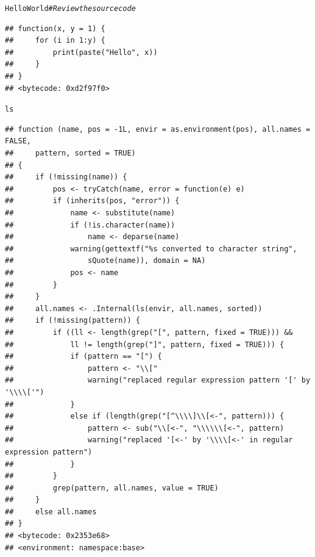 \documentclass{beamer}\usepackage[]{graphicx}\usepackage[]{color}
\makeatletter
\newcommand{\hlcom}[1]{\textcolor[rgb]{0.678,0.584,0.686}{\textit{#1}}}%
\newcommand{\hlstd}[1]{\textcolor[rgb]{0.345,0.345,0.345}{#1}}%
\newenvironment{kframe}{%
 \def\at@end@of@kframe{}%
 \ifinner\ifhmode%
  \def\at@end@of@kframe{\end{minipage}}%
  \begin{minipage}{\columnwidth}%
 \fi\fi%
 \def\FrameCommand##1{\hskip\@totalleftmargin \hskip-\fboxsep
 \colorbox{shadecolor}{##1}\hskip-\fboxsep
     \hskip-\linewidth \hskip-\@totalleftmargin \hskip\columnwidth}%
 \MakeFramed {\advance\hsize-\width
   \@totalleftmargin\z@ \linewidth\hsize
   \@setminipage}}%
 {\par\unskip\endMakeFramed%
 \at@end@of@kframe}
\newenvironment{knitrout}{}{} %
\makeatother
\begin{document}
\begin{frame}
\begin{knitrout}\scriptsize
{}\color{fgcolor}\begin{kframe}
\begin{alltt}
\hlstd{HelloWorld}  \hlcom{# Review the source code}
\end{alltt}
\begin{verbatim}
## function(x, y = 1) {
##     for (i in 1:y) {
##         print(paste("Hello", x))
##     }
## }
## <bytecode: 0xd2f97f0>
\end{verbatim}
\begin{alltt}
\hlstd{ls}
\end{alltt}
\begin{verbatim}
## function (name, pos = -1L, envir = as.environment(pos), all.names = FALSE, 
##     pattern, sorted = TRUE) 
## {
##     if (!missing(name)) {
##         pos <- tryCatch(name, error = function(e) e)
##         if (inherits(pos, "error")) {
##             name <- substitute(name)
##             if (!is.character(name)) 
##                 name <- deparse(name)
##             warning(gettextf("%s converted to character string", 
##                 sQuote(name)), domain = NA)
##             pos <- name
##         }
##     }
##     all.names <- .Internal(ls(envir, all.names, sorted))
##     if (!missing(pattern)) {
##         if ((ll <- length(grep("[", pattern, fixed = TRUE))) && 
##             ll != length(grep("]", pattern, fixed = TRUE))) {
##             if (pattern == "[") {
##                 pattern <- "\\["
##                 warning("replaced regular expression pattern '[' by  '\\\\['")
##             }
##             else if (length(grep("[^\\\\]\\[<-", pattern))) {
##                 pattern <- sub("\\[<-", "\\\\\\[<-", pattern)
##                 warning("replaced '[<-' by '\\\\[<-' in regular expression pattern")
##             }
##         }
##         grep(pattern, all.names, value = TRUE)
##     }
##     else all.names
## }
## <bytecode: 0x2353e68>
## <environment: namespace:base>
\end{verbatim}
\end{kframe}
\end{knitrout}
\end{frame}
\end{document}
